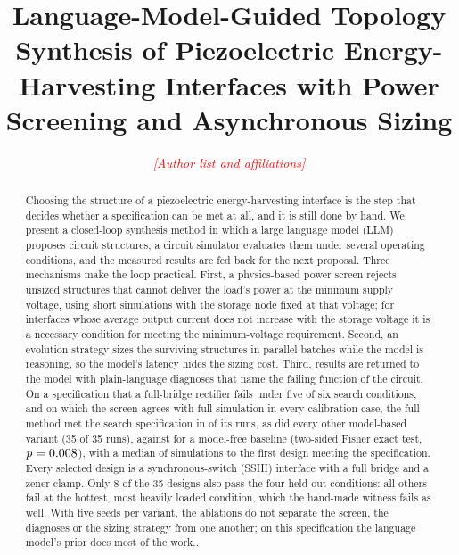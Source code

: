 \documentclass[journal]{IEEEtran}
\newcommand{\pending}[1]{\textcolor{red}{\textit{[#1]}}}
\begin{document}
\title{Language-Model-Guided Topology Synthesis of Piezoelectric Energy-Harvesting Interfaces with Power Screening and Asynchronous Sizing}

\author{\pending{Author list and affiliations}}

\maketitle

\begin{abstract}
Choosing the structure of a piezoelectric energy-harvesting interface is the step that decides whether a
specification can be met at all, and it is still done by hand. We present a closed-loop synthesis method in
which a large language model (LLM) proposes circuit structures, a circuit simulator evaluates them under
several operating conditions, and the measured results are fed back for the next proposal. Three
mechanisms make the loop practical. First, a physics-based power screen rejects unsized structures that
cannot deliver the load's power at the minimum supply voltage, using short simulations with the storage
node fixed at that voltage; for interfaces whose average output current does not increase with the
storage voltage it is a necessary condition for meeting the minimum-voltage requirement. Second, an
evolution strategy sizes the surviving structures in parallel batches while the model is reasoning, so
the model's latency hides the sizing cost. Third, results are returned to the model with plain-language
diagnoses that name the failing function of the circuit. On a specification that a full-bridge rectifier
fails under five of six search conditions, and on which the screen agrees with full simulation in every
calibration case, the full method met the search specification in \FullSuccess{} of its
runs, as did every other model-based variant (35 of 35 runs), against \RandomSuccess{} for a model-free
baseline (two-sided Fisher exact test, $p=0.008{}$), with a median of \FullSimsToSuccess{}
simulations to the first design meeting the specification. Every selected design is a synchronous-switch
(SSHI) interface with a full bridge and a zener clamp. Only 8 of the 35 designs also pass the four held-out
conditions: all others fail at the hottest, most heavily loaded condition, which the hand-made witness fails
as well. With five seeds per variant, the ablations do not separate the screen, the diagnoses or the
sizing strategy from one another; on this specification the language model's prior does most of the work..
\end{abstract}
\end{document}
